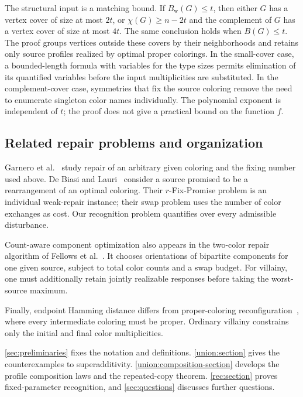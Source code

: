 \documentclass[11pt,reqno]{amsart}
\numberwithin{equation}{section}
\theoremstyle{definition}
\theoremstyle{remark}
\begin{document}
The structural input is a matching bound. If
$B_{\mathrm w}(G)\le t$, then either $G$ has a vertex cover of size at
most $2t$, or $\chi(G)\ge n-2t$ and the complement of $G$ has a vertex
cover of size at most $4t$. The same conclusion holds when
$B(G)\le t$. The proof groups vertices outside these covers by their
neighborhoods and retains only source profiles realized by optimal
proper colorings.
In the small-cover case, a bounded-length formula with variables for
the type sizes permits elimination of its quantified variables before
the input multiplicities are substituted. In the complement-cover
case, symmetries that fix the source coloring remove the need to
enumerate singleton color names individually.
The polynomial exponent is independent of $t$; the proof does not
give a practical bound on the function $f$.

\subsection{Related repair problems and organization}

Garnero et al.~\cite{garnero2018} study repair of an arbitrary given
coloring and the fixing number used above. De Biasi and
Lauri~\cite{debiasi2019} consider a source promised to be a
rearrangement of an optimal coloring. Their $r$-Fix-Promise problem
is an individual weak-repair instance; their swap problem uses the
number of color exchanges as cost. Our recognition problem
quantifies over every admissible disturbance.

Count-aware component optimization also appears in the two-color
repair algorithm of Fellows et al.~\cite{fellows2026}. It chooses
orientations of bipartite components for one given source, subject
to total color counts and a swap budget. For villainy, one must additionally retain jointly realizable
responses before taking the worst-source maximum.

Finally, endpoint Hamming distance differs from proper-coloring
reconfiguration~\cite{Bousquet2024,fuchs2025}, where every intermediate
coloring must be proper. Ordinary villainy constrains only the initial
and final color multiplicities.

\cref{sec:preliminaries} fixes the notation and definitions.
\cref{union:section} gives the counterexamples to
superadditivity. \cref{union:composition-section} develops the
profile composition laws and the repeated-copy theorem.
\cref{rec:section} proves fixed-parameter recognition, and
\cref{sec:questions} discusses further questions.
\end{document}
